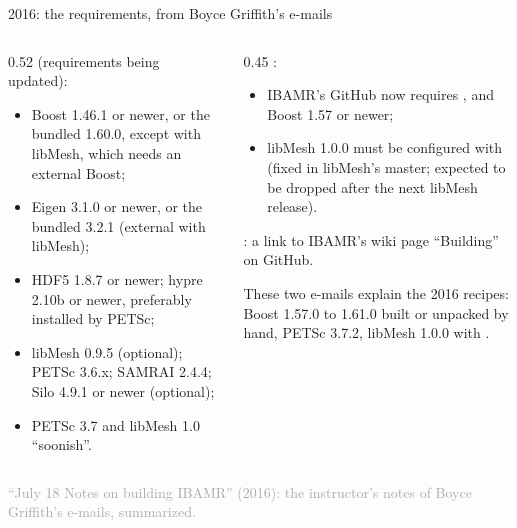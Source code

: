 \documentclass[aspectratio=169,11pt]{beamer}
\newcommand{\sourcecredit}[1]{\vfill\begin{flushright}\tiny\textcolor{DarkGray}{#1}\end{flushright}}
\begin{document}
\begin{frame}{2016: the requirements, from Boyce Griffith's e-mails}
\label{fr:req2016}
\begin{columns}[T,onlytextwidth]
\begin{column}{0.52\textwidth}
\footnotesize {} (requirements being updated):
\begin{itemize}\setlength{\itemsep}{2pt}
  \item Boost 1.46.1 or newer, or the bundled 1.60.0, except with libMesh, which needs an external Boost;
  \item Eigen 3.1.0 or newer, or the bundled 3.2.1 (external with libMesh);
  \item HDF5 1.8.7 or newer; hypre 2.10b or newer, preferably installed by PETSc;
  \item libMesh 0.9.5 (optional); PETSc 3.6.x; SAMRAI 2.4.4; Silo 4.9.1 or newer (optional);
  \item PETSc 3.7 and libMesh 1.0 ``soonish''.
\end{itemize}
\end{column}
\begin{column}{0.45\textwidth}
\footnotesize {}:
\begin{itemize}\setlength{\itemsep}{2pt}
  \item IBAMR's GitHub  now requires , and Boost 1.57 or newer;
  \item libMesh 1.0.0 must be configured with  (fixed in libMesh's master; expected to be dropped after the next libMesh release).
\end{itemize}
\vspace{1mm}
: a link to IBAMR's wiki page ``Building'' on GitHub.
\vspace{2mm}
\begin{punchbox}
\footnotesize These two e-mails explain the 2016 recipes: Boost 1.57.0 to 1.61.0 built or unpacked by hand, PETSc 3.7.2, libMesh 1.0.0 with .
\end{punchbox}
\end{column}
\end{columns}
\sourcecredit{``July 18 Notes on building IBAMR'' (2016): the instructor's notes of Boyce Griffith's e-mails, summarized.}
\end{frame}
\end{document}
